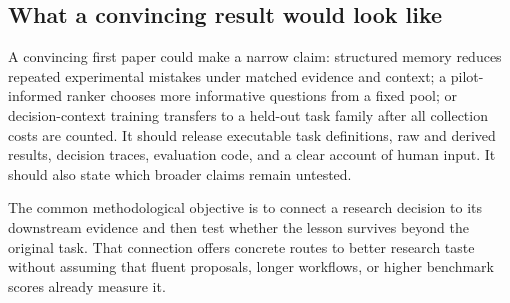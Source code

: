 \subsection{What a convincing result would look like}

A convincing first paper could make a narrow claim: structured memory reduces repeated experimental mistakes under matched evidence and context; a pilot-informed ranker chooses more informative questions from a fixed pool; or decision-context training transfers to a held-out task family after all collection costs are counted. It should release executable task definitions, raw and derived results, decision traces, evaluation code, and a clear account of human input. It should also state which broader claims remain untested.

The common methodological objective is to connect a research decision to its downstream evidence and then test whether the lesson survives beyond the original task. That connection offers concrete routes to better research taste without assuming that fluent proposals, longer workflows, or higher benchmark scores already measure it.
